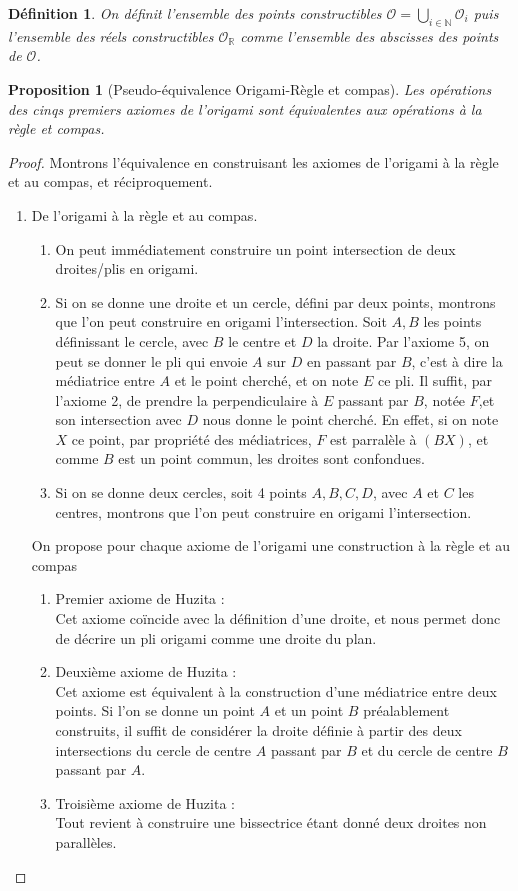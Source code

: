 \documentclass[a4paper,12pt,french]{report}
\newtheorem{proposition}{Proposition}[section]
\newtheorem{definition}{Définition}[section]
\begin{document}
			\begin{definition}
				On définit l'ensemble des points constructibles \(\mathcal{O} = \bigcup_{i \in \mathbb{N}} \mathcal{O}_i \) puis l'ensemble des réels constructibles \(\mathcal{O}_\mathbb{R}\) comme l'ensemble des abscisses des points de \( \mathcal{O} \).
			\end{definition}

			\begin{proposition}[Pseudo-équivalence Origami-Règle et compas]
			Les opérations des cinqs premiers axiomes de l'origami sont équivalentes aux opérations à la règle et compas.
			\end{proposition}
			\begin{proof}
			Montrons l'équivalence en construisant les axiomes de l'origami à la règle et au compas, et réciproquement.
			\begin{enumerate}
				\item De l'origami à la règle et au compas.
				\begin{enumerate}
					\item On peut immédiatement construire un point intersection de deux droites\slash plis en origami.
					\item Si on se donne une droite et un cercle, défini par deux points, montrons que l'on peut construire en origami l'intersection.
					Soit $A,B$ les points définissant le cercle, avec $B$ le centre et $D$ la droite. Par l'axiome 5, on peut se donner le pli qui envoie $A$ sur $D$ en passant par $B$, c'est à dire la médiatrice entre $A$ et le point cherché, et on note $E$ ce pli. Il suffit, par l'axiome 2, de prendre la perpendiculaire à $E$ passant par $B$, notée $F$,et son intersection avec $D$ nous donne le point cherché. En effet, si on note $X$ ce point, par propriété des médiatrices, $F$ est parralèle à $(BX)$, et comme $B$ est un point commun, les droites sont confondues.
					\item Si on se donne deux cercles, soit 4 points $A,B,C,D$, avec $A$ et $C$ les centres, montrons que l'on peut construire en origami l'intersection.
				\end{enumerate}
				
				On propose pour chaque axiome de l'origami une construction à la règle et au compas
			\begin{enumerate}
				\item{Premier axiome de Huzita :} \\
					Cet axiome coïncide avec la définition d'une droite, et nous permet donc de décrire un pli origami comme une droite du plan.
				\item{Deuxième axiome de Huzita :}\\
					Cet axiome est équivalent à la construction d'une médiatrice entre deux points. Si l'on se donne un point $A$ et un point $B$ préalablement construits, il suffit de considérer la droite définie à partir des deux intersections du cercle de centre $A$ passant par $B$ et du cercle de centre $B$ passant par $A$.
				\item{Troisième axiome de Huzita :}\\
					Tout revient à construire une bissectrice étant donné deux droites non parallèles.
					

\end{enumerate}
\end{enumerate}
\end{proof}
\end{document}
